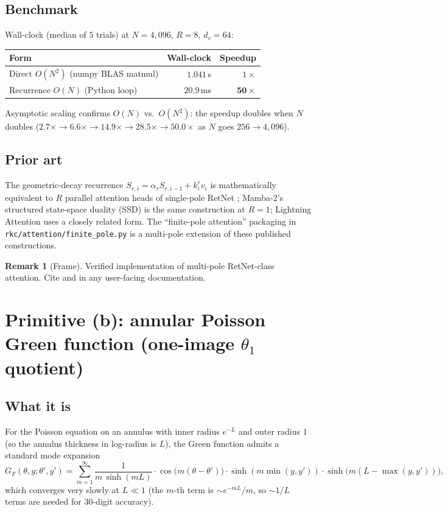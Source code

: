 \documentclass[11pt,reqno]{amsart}
\theoremstyle{definition}
\newtheorem{remark}[theorem]{Remark}
\begin{document}
\subsection{Benchmark}
Wall-clock (median of $5$ trials) at $N = 4{,}096$, $R = 8$,
$d_v = 64$:
\begin{center}
\begin{tabular}{lrr}
\toprule
Form & Wall-clock & Speedup \\
\midrule
Direct $O(N^2)$ (numpy BLAS matmul) & $1.041$\,s & $1\times$ \\
Recurrence $O(N)$ (Python loop) & $20.9$\,ms & $\mathbf{50\times}$ \\
\bottomrule
\end{tabular}
\end{center}
Asymptotic scaling confirms $O(N)$ vs.\ $O(N^2)$: the speedup doubles
when $N$ doubles ($2.7\times \to 6.6\times \to 14.9\times \to
28.5\times \to 50.0\times$ as $N$ goes $256 \to 4{,}096$).

\subsection{Prior art}
The geometric-decay recurrence
$S_{r, i} = \alpha_r S_{r, i-1} + k_i^r v_i$ is mathematically
equivalent to $R$ parallel attention heads of single-pole RetNet
\cite{SunRetNet2023}; Mamba-2's structured state-space duality (SSD)
\cite{DaoGuSSD2024} is the same construction at $R = 1$; Lightning
Attention \cite{QinLightningAttention2024} uses a closely related form.
The ``finite-pole attention'' packaging in
\verb|rkc/attention/finite_pole.py| is a multi-pole extension of these
published constructions.

\begin{remark}[Frame]
Verified implementation of multi-pole RetNet-class attention. Cite
\cite{SunRetNet2023} and \cite{DaoGuSSD2024} in any user-facing
documentation.
\end{remark}

\section{Primitive (b): annular Poisson Green function (one-image \texorpdfstring{$\theta_1$}{theta1} quotient)}\label{sec:annular}

\subsection{What it is}
For the Poisson equation on an annulus with inner radius $e^{-L}$ and
outer radius $1$ (so the annulus thickness in log-radius is $L$), the
Green function admits a standard mode expansion
\begin{equation}\label{eq:annular-fourier}
G_F(\theta, y; \theta', y') = \sum_{m = 1}^{\infty}
\frac{1}{m \, \sinh(mL)} \cdot \cos\bigl(m(\theta - \theta')\bigr)
\cdot \sinh(m \min(y, y'))
\cdot \sinh\bigl(m(L - \max(y, y'))\bigr),
\end{equation}
which converges very slowly at $L \ll 1$ (the $m$-th term is
$\sim e^{-mL}/m$, so $\sim 1/L$ terms are needed for $30$-digit
accuracy).
\end{document}
